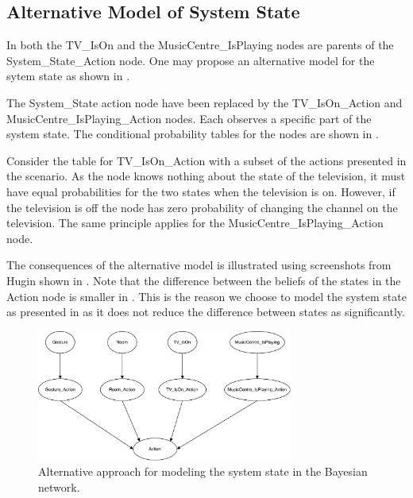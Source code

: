 \subsection{Alternative Model of System State}

In  both the TV\_IsOn and the MusicCentre\_IsPlaying nodes are parents of the System\_State\_Action node. One may propose an alternative model for the sytem state as shown in .

The System\_State action node have been replaced by the TV\_IsOn\_Action and MusicCentre\_IsPlaying\_Action nodes. Each observes a specific part of the system state. The conditional probability tables for the nodes are shown in .

Consider the table for TV\_IsOn\_Action with a subset of the actions presented in the scenario. As the node knows nothing about the state of the television, it must have equal probabilities for the two states when the television is on. However, if the television is off the node has zero probability of changing the channel on the television. The same principle applies for the MusicCentre\_IsPlaying\_Action node.

The consequences of the alternative model is illustrated using screenshots from Hugin shown in . Note that the difference between the beliefs of the states in the Action node is smaller in . This is the reason we choose to model the system state as presented in  as it does not reduce the difference between states as significantly.

\begin{figure}[h!]
\centering
\includegraphics[width=0.75\textwidth]{images/bayesian-network-split-system-state}
\caption{Alternative approach for modeling the system state in the Bayesian network.}
\label{fig:design:bayesian-network:alternative-network}
\end{figure}

